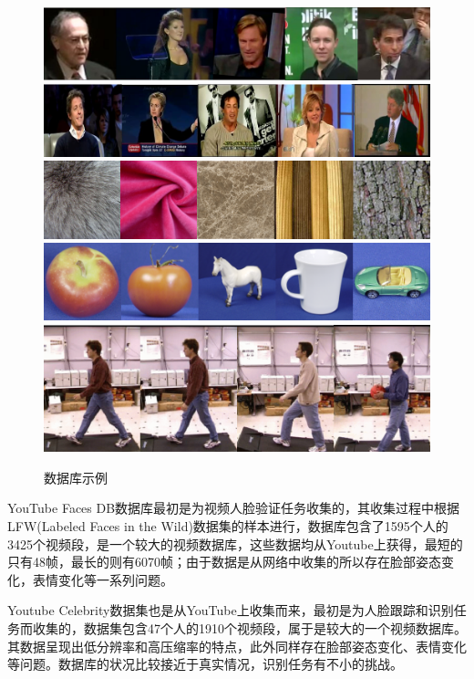 \begin{figure}[htb]
	\centering
      	{\includegraphics[width=0.49\linewidth]{source/YTF.png}}
      	{\includegraphics[width=0.49\linewidth]{source/YTC.png}}
    	{\includegraphics[width=0.49\linewidth]{source/UIUC.png}}
      	{\includegraphics[width=0.49\linewidth]{source/ETH80.png}}
      	{\includegraphics[width=0.5\linewidth]{source/CMUMoBo.png}}
  	\caption{数据库示例}
  	\label{fig:databases_exmples}
\end{figure}

YouTube Faces DB数据库\cite{Database_YTF}最初是为视频人脸验证任务收集的，其收集过程中根据LFW(Labeled Faces in the Wild\cite{Database_LFW})数据集的样本进行，数据库包含了1595个人的3425个视频段，是一个较大的视频数据库，这些数据均从Youtube上获得，最短的只有48帧，最长的则有6070帧；由于数据是从网络中收集的所以存在脸部姿态变化，表情变化等一系列问题。

Youtube Celebrity数据集\cite{Database_YTC}也是从YouTube上收集而来，最初是为人脸跟踪和识别任务而收集的，数据集包含47个人的1910个视频段，属于是较大的一个视频数据库。其数据呈现出低分辨率和高压缩率的特点，此外同样存在脸部姿态变化、表情变化等问题。数据库的状况比较接近于真实情况，识别任务有不小的挑战。

